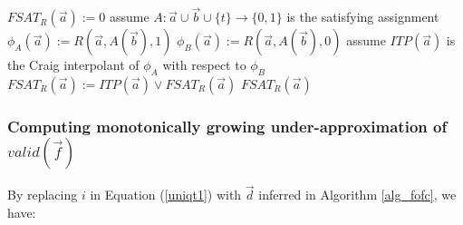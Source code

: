 %

\begin{algorithm}[t]
\SetAlgoVlined
{}
$FSAT_R(\vec{a}):= 0$ \;
 {
  assume $A:\vec{a}\cup\vec{b}\cup\{t\}\rightarrow \{0,1\}$ is the satisfying assignment \;
  $\phi_A(\vec{a}):= R(\vec{a},A(\vec{b}),1)$ \;
  $\phi_B(\vec{a}):= R(\vec{a},A(\vec{b}),0)$ \;
  assume $ITP(\vec{a})$ is the Craig interpolant of $\phi_A$ with respect to $\phi_B$ \;
  $FSAT_R(\vec{a}):= ITP(\vec{a}) \vee FSAT_R(\vec{a})$ \;
}
\KwRet $FSAT_R(\vec{a})$
\caption{$CharacterizingFormulaSAT(R,\vec{a},\vec{b},t)$
}
\label{alg_craigchar}
\end{algorithm}

\subsubsection{Computing monotonically growing under-approximation of $valid(\vec{f})$}\label{subsub_nonloop}
By replacing $i$ in Equation (\ref{uniqt1}) with $\vec{d}$ inferred in Algorithm \ref{alg_fofc},
we have:

